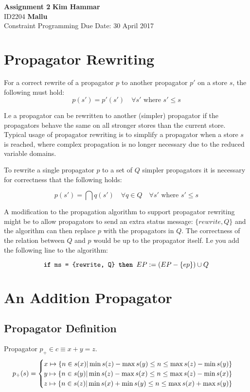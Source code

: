 \documentclass[a4paper, 11pt]{article}
\newcommand\mymapsto{\mathrel{\ooalign{$\rightarrow$\cr%
  \kern-.15ex\raise.275ex\hbox{\scalebox{1}[0.522]{$\mid$}}\cr}}}
\begin{document}
\noindent
\large\textbf{Assignment 2} \hfill \textbf{Kim Hammar} \\
\normalsize ID2204 \hfill  \textbf{Mallu} \\
Constraint Programming \hfill Due Date: 30 April 2017\\

\section*{Propagator Rewriting}
For a correct rewrite of a propagator $p$ to another propagator $p'$ on a store $s$, the following must hold:
$$p(s') = p'(s') \quad \forall s' \text{ where } s' \leq s$$

I.e a propagator can be rewritten to another (simpler) propagator if the propagators behave the same on all stronger stores than the current store. Typical usage of propagator rewriting is to simplify a propagator when a store $s$ is reached, where complex propagation is no longer necessary due to the reduced variable domains.

To rewrite a single propagator $p$ to a set of $Q$ simpler propagators it is necessary for correctness that the following holds:

$$p(s') = \displaystyle\bigcap q(s') \quad \forall q \in Q \quad \forall s' \text{ where } s' \leq s$$

A modification to the propagation algorithm to support propagator rewriting might be to allow propagators to send an extra status message: $\{rewrite, Q\}$ and the algorithm can then replace $p$ with the propagators in $Q$. The correctness of the relation between $Q$ and $p$ would be up to the propagator itself. I.e you add the following line to the algorithm:

$$\text{\texttt{\textbf{if} ms = \{rewrite, Q\} \textbf{then }}} EP:= (EP - \{ep\}) \cup Q$$

\section*{An Addition Propagator}
\subsection*{Propagator Definition}
Propagator $p_+ \in c \equiv x + y = z$.
\begin{gather*}
p_+(s) = 
\begin{cases}
  x \mymapsto \{n \in s(x) | \min s(z) - \max s(y) \leq n \leq \max s(z) - \min s(y) \}\\
  y \mymapsto \{n \in s(y) | \min s(z) - \max s(x) \leq n \leq \max s(z) - \min s(x) \}\\
  z \mymapsto \{n \in s(z) | \min s(x) + \min s(y) \leq n \leq \max s(x) + \max s(y) \}\\    
\end{cases}
\end{gather*}
\end{document}
